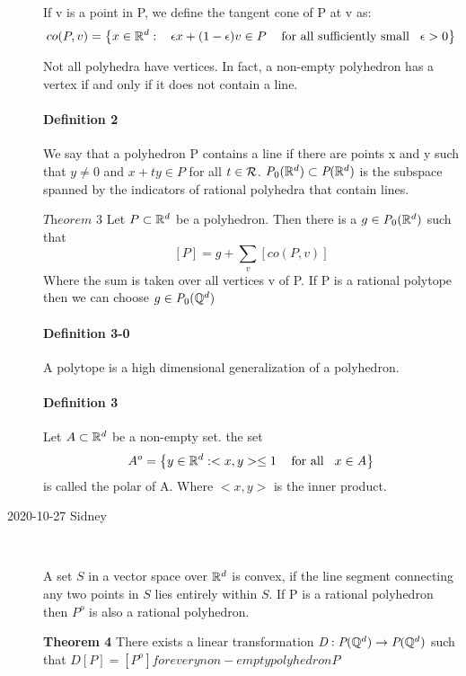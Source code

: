\begin{description}
If v is a point in P, we define the tangent cone of P at v as:
$$co(P,v)=\left\lbrace x\in\mathbb{R}^d:
   \hspace{3mm} \epsilon x+(1-\epsilon)v\in P \hspace{3mm}\mbox{ for all sufficiently small} \hspace{3mm}\epsilon>0\right\rbrace$$

Not all polyhedra have vertices. In fact, a non-empty polyhedron has a vertex if and only if it does not contain a line.

\paragraph{Definition  2}
We say that a polyhedron P contains a line if there are points x and y
such that $y\neq 0$ and $x+ty\in P$ for all $t\in\mathcal{R}$.
$\textit{P}_0(\mathbb{R}^d)\subset\textit{P}(\mathbb{R}^d)$ is the subspace
spanned by the indicators of rational polyhedra that contain lines.

$\textit{Theorem 3}$ Let $P\subset\mathbb{R}^d$ be a polyhedron. Then there is a $g\in\textit{P}_0(\mathbb{R}^d)$ such that
$$[P]=g+\sum_v[co(P,v)]$$
Where the sum is taken over all vertices v of P. If P is a rational polytope then we can choose $g\in\textit{P}_0({\mathbb{Q}}^d)$

\paragraph{Definition 3-0}
A polytope is a high dimensional generalization of a polyhedron.

\paragraph{Definition  3} Let $A\subset\mathbb{R}^d$ be a non-empty set. the set
$$A^o=\left\lbrace y\in\mathbb{R}^d:<x,y>\leq 1 \hspace{3mm}\mbox{ for all}\hspace{3mm}x\in A\right\rbrace$$
is called the polar of A. Where $<x,y>$ is the inner product.

\item[2020-10-27 Sidney]~

A set $S$ in a vector space over $\mathbb{R}^d$ is convex, if the line segment
connecting any two points in $S$ lies entirely within $S$. If P is a
rational polyhedron then $P^o$ is also a rational polyhedron.

\textbf{Theorem 4}
There exists a linear transformation $\textit{D}:\textit{P}({\mathbb{Q}}^d)\rightarrow\textit{P}({\mathbb{Q}}^d)$ such that $\textit{D}[P]=[P^o] for every non-empty polyhedron P$


\end{description}
